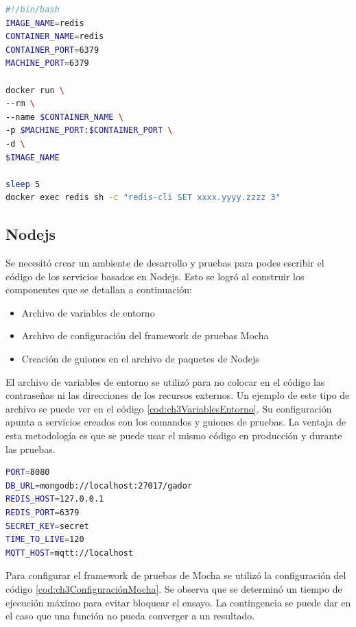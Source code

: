 \begin{lstlisting}[language=bash,label=cod:ch3GuionRedis,caption=Guión de Redis.]
#!/bin/bash
IMAGE_NAME=redis
CONTAINER_NAME=redis
CONTAINER_PORT=6379
MACHINE_PORT=6379

docker run \
--rm \
--name $CONTAINER_NAME \
-p $MACHINE_PORT:$CONTAINER_PORT \
-d \
$IMAGE_NAME

sleep 5
docker exec redis sh -c "redis-cli SET xxxx.yyyy.zzzz 3"
\end{lstlisting}

\newpage

\subsection{Nodejs}
Se necesitó crear un ambiente de desarrollo y pruebas para podes escribir el código de los servicios basados en Nodejs.
Esto se logró al construir los componentes que se detallan a continuación:


\begin{itemize}
	\item Archivo de variables de entorno
	\item Archivo de configuración del framework de pruebas Mocha
	\item Creación de guiones en el archivo de paquetes de Nodejs
\end{itemize}

El archivo de variables de entorno se utilizó para no colocar en el código las contraseñas ni las direcciones de los recursos externos.
Un ejemplo de este tipo de archivo se puede ver en el código \ref{cod:ch3VariablesEntorno}.
Su configuración apunta a servicios creados con los comandos y guiones de pruebas.
La ventaja de esta metodología es que se puede usar el mismo código en producción y durante las pruebas.

\begin{lstlisting}[language=bash,label=cod:ch3VariablesEntorno,caption=Archivo de variables de entorno.]
PORT=8080
DB_URL=mongodb://localhost:27017/gador
REDIS_HOST=127.0.0.1
REDIS_PORT=6379
SECRET_KEY=secret
TIME_TO_LIVE=120
MQTT_HOST=mqtt://localhost
\end{lstlisting}

Para configurar el framework de pruebas de Mocha se utilizó la configuración del código \ref{cod:ch3ConfiguraciónMocha}.
Se observa que se determinó un tiempo de ejecución máximo para evitar bloquear el ensayo.
La contingencia se puede dar en el caso que una función no pueda converger a un resultado.

